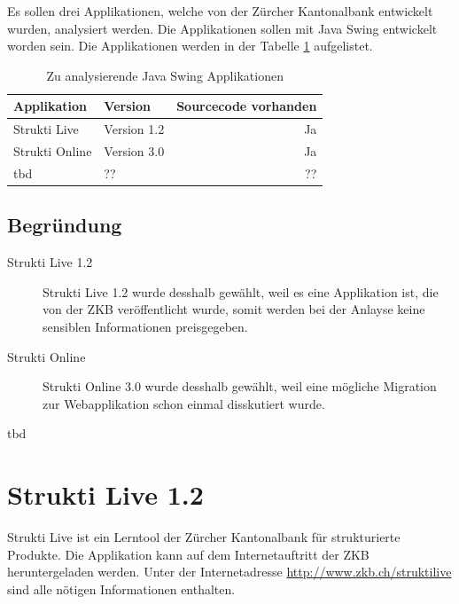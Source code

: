   Es sollen drei Applikationen, welche von der Zürcher Kantonalbank entwickelt
  wurden, analysiert werden. Die Applikationen sollen mit Java Swing entwickelt
  worden sein. Die Applikationen werden in der Tabelle
  \ref{tab:zuAnalysierendeJavaSwingApplikationen} aufgelistet.
  \newline
  
  \begin{table}[ht]
    \begin{center}
      \begin{tabular}{llr}
        \toprule
        Applikation & Version & Sourcecode vorhanden \\
        \midrule
        Strukti Live & Version 1.2 & Ja\\
        Strukti Online & Version 3.0 & Ja\\
        tbd & ?? & ??\\
        \bottomrule
      \end{tabular}
      \caption{Zu analysierende Java Swing Applikationen}
      \label{tab:zuAnalysierendeJavaSwingApplikationen}
    \end{center}
  \end{table}
  
  \subsection{Begründung}
  
  \begin{description}
  \item[Strukti Live 1.2]
  Strukti Live 1.2 wurde desshalb gewählt, weil es eine Applikation ist, die
  von der ZKB veröffentlicht wurde, somit werden bei der Anlayse keine
  sensiblen Informationen preisgegeben.
  \item[Strukti Online]
  Strukti Online 3.0 wurde desshalb gewählt, weil eine mögliche Migration zur
  Webapplikation schon einmal disskutiert wurde.
  \item[tbd]
  \end{description}
  
  \section{Strukti Live 1.2}
  
  Strukti Live ist ein Lerntool der Zürcher Kantonalbank für strukturierte
  Produkte. Die Applikation kann auf dem Internetauftritt der ZKB
  heruntergeladen werden. Unter der Internetadresse
  \url{http://www.zkb.ch/struktilive} sind alle nötigen Informationen
  enthalten.
  
